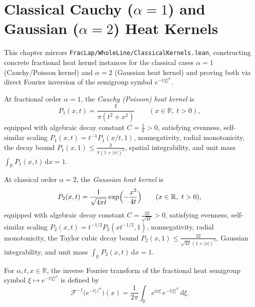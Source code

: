 \chapter{Classical Cauchy ($\alpha = 1$) and Gaussian ($\alpha = 2$) Heat Kernels}

This chapter mirrors \texttt{FracLap/WholeLine/ClassicalKernels.lean}, constructing concrete fractional heat kernel instances for the classical cases $\alpha = 1$ (Cauchy/Poisson kernel) and $\alpha = 2$ (Gaussian heat kernel) and proving both via direct Fourier inversion of the semigroup symbol $e^{-t\lvert \xi \rvert^\alpha}$.

\begin{definition}\label{def:cauchy_heat_kernel}
\leanok
At fractional order $\alpha = 1$, the \emph{Cauchy (Poisson) heat kernel} is
\[
  P_1(x, t) = \frac{t}{\pi (t^2 + x^2)} \qquad (x \in \mathbb{R},\ t > 0),
\]
equipped with algebraic decay constant $C = \frac{2}{\pi} > 0$, satisfying evenness, self-similar scaling $P_1(x, t) = t^{-1} P_1(x / t, 1)$, nonnegativity, radial monotonicity, the decay bound $P_1(x, 1) \le \frac{2}{\pi (1 + \lvert x \rvert)^2}$, spatial integrability, and unit mass $\int_{\mathbb{R}} P_1(x, t)\, \mathrm{d}x = 1$.
\end{definition}

\begin{definition}\label{def:gaussian_heat_kernel}
\leanok
At classical order $\alpha = 2$, the \emph{Gaussian heat kernel} is
\[
  P_2(x, t) = \frac{1}{\sqrt{4 \pi t}} \exp\Bigl(-\frac{x^2}{4t}\Bigr) \qquad (x \in \mathbb{R},\ t > 0),
\]
equipped with algebraic decay constant $C = \frac{32}{\sqrt{4\pi}} > 0$, satisfying evenness, self-similar scaling $P_2(x, t) = t^{-1/2} P_2(x t^{-1/2}, 1)$, nonnegativity, radial monotonicity, the Taylor cubic decay bound $P_2(x, 1) \le \frac{32}{\sqrt{4\pi}(1 + \lvert x \rvert)^3}$, Gaussian integrability, and unit mass $\int_{\mathbb{R}} P_2(x, t)\, \mathrm{d}x = 1$.
\end{definition}

\begin{definition}\label{def:fourier_inv_symbol}
\leanok
For $\alpha, t, x \in \mathbb{R}$, the inverse Fourier transform of the fractional heat semigroup symbol $\xi \mapsto e^{-t \lvert \xi \rvert^\alpha}$ is defined by
\[
  \mathcal{F}^{-1}\bigl(e^{-t \lvert \cdot \rvert^\alpha}\bigr)(x) = \frac{1}{2\pi} \int_{\mathbb{R}} e^{\mathrm{i} x \xi}\, e^{-t \lvert \xi \rvert^\alpha}\, \mathrm{d}\xi.
\]
\end{definition}


